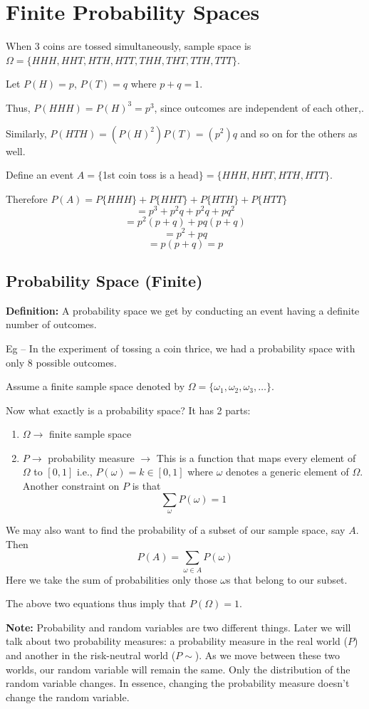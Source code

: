 \documentclass{article}
\begin{document}
\section{Finite Probability Spaces}

When 3 coins are tossed simultaneously, sample space is $\Omega = \{HHH,HHT,HTH,HTT,THH,THT,TTH,TTT\}$.

Let $P(H)=p$, $P(T)=q$ where $p+q=1$.

Thus, $P(HHH)=P(H)^3 = p^{3}$, since outcomes are independent of each other,.

Similarly, $P(HTH) = (P(H)^2)P(T) = (p^{2})q$ and so on for the others as well.

Define an event $A = \{$1st coin toss is a head$\} = \{HHH,HHT,HTH,HTT\}$.

Therefore $P(A) = P\{HHH\}+P\{HHT\}+P\{HTH\} + P\{HTT\}$
\[= p^{3} +p^{2}q +p^{2}q+pq^{2}\]
\[= p^{2}(p+q) + pq(p+q)\]
\[= p^{2}+pq \]
\[= p(p+q)=p\]

\subsection*{Probability Space (Finite)}

\textbf{Definition:} A probability space we get by conducting an event having a definite number of outcomes.

Eg – In the experiment of tossing a coin thrice, we had a probability space with only 8 possible outcomes.

Assume a finite sample space denoted by $\Omega =\{\omega_{1}, \omega_{2}, \omega_{3},\ldots\}$.

Now what exactly is a probability space? It has 2 parts:

\begin{enumerate}
    \item $\Omega \rightarrow$ finite sample space
    \item $P \rightarrow$ probability measure $\rightarrow$ This is a function that maps every element of $\Omega$ to $[0,1]$ i.e., $P(\omega)=k \in [0,1]$ where $\omega$ denotes a generic element of $\Omega$. Another constraint on $P$ is that 
    \[\sum_{\omega} P(\omega)=1\]
\end{enumerate}

We may also want to find the probability of a subset of our sample space, say $A$. Then 
\[P(A)=\sum_{\omega \in A} P(\omega)\]
Here we take the sum of probabilities only those $\omega$s that belong to our subset.

The above two equations thus imply that $P(\Omega)=1$.

\textbf{Note:} Probability and random variables are two different things. Later we will talk about two probability measures: a probability measure in the real world ($P$) and another in the risk-neutral world ($P\sim$). As we move between these two worlds, our random variable will remain the same. Only the distribution of the random variable changes. In essence, changing the probability measure doesn't change the random variable.
\end{document}
